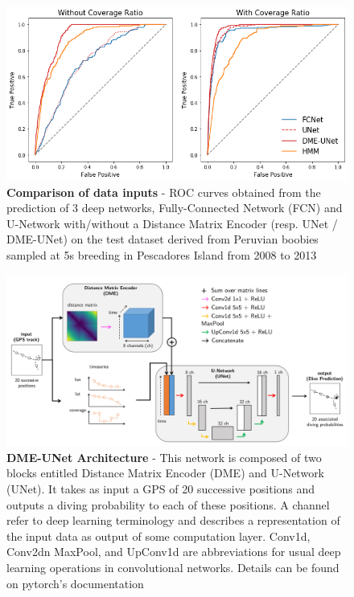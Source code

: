 \documentclass{article}
\begin{document}
\begin{figure}[h]
  \centering
  \includegraphics[scale=0.5]{figure2.png}
  \caption{\textbf{Comparison of data inputs} - ROC curves obtained from the prediction of 3 deep networks, Fully-Connected Network (FCN) and U-Network with/without a Distance Matrix Encoder (resp. UNet / DME-UNet) on the test dataset derived from Peruvian boobies sampled at 5s breeding in Pescadores Island from 2008 to 2013}
  \label{figure2}
\end{figure}

\begin{figure}[h]
  \hspace*{-2cm}
  \includegraphics[scale=0.45]{figure3.png}
  \caption{\textbf{DME-UNet Architecture} - This network is composed of two blocks entitled Distance Matrix Encoder (DME) and U-Network (UNet). It takes as input a GPS of 20 successive positions and outputs a diving probability to each of these positions. A channel refer to deep learning terminology and describes a representation of the input data as output of some computation layer. Conv1d, Conv2dn MaxPool, and UpConv1d are abbreviations for usual deep learning operations in convolutional networks. Details can be found on pytorch's documentation \citep{paskze_pytorch_2019} }
  \label{figure3}
\end{figure}
\end{document}
